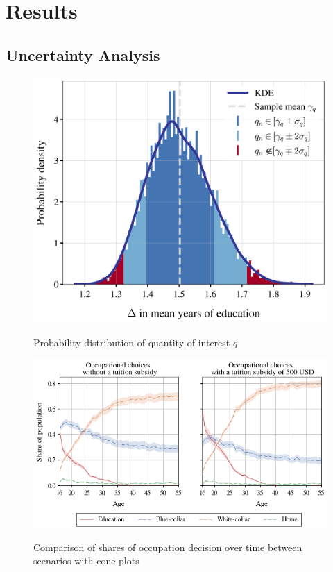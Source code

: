 \documentclass[a4paper,12pt]{article}
\begin{document}
\newpage %

\section{Results}

\subsection{Uncertainty Analysis}

\begin{figure}[H]
	\caption{Probability distribution of quantity of interest $q$}
	\centering
	\includegraphics[scale=0.7]{../../../scrypy/figures/distplot}
	\label{fig:dist}
\end{figure}

\begin{figure}[H]
	\caption{Comparison of shares of occupation decision over time between scenarios with cone plots}
	\centering
	\includegraphics[scale=0.75]{../../../scrypy/figures/cone_plot_choice_shares}
	\label{fig:paths}
\end{figure}
\end{document}
